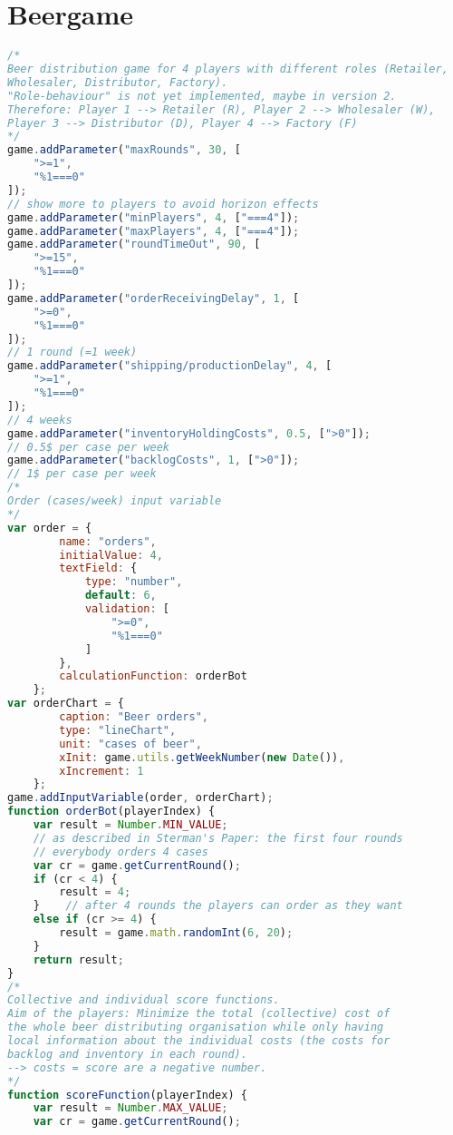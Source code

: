 \section{Beergame} \label{App:beer}
\begin{lstlisting}[language=Javascript, caption=Game code of the beergame, label=lst:beergame]
/* 
Beer distribution game for 4 players with different roles (Retailer,
Wholesaler, Distributor, Factory).
"Role-behaviour" is not yet implemented, maybe in version 2.
Therefore: Player 1 --> Retailer (R), Player 2 --> Wholesaler (W),
Player 3 --> Distributor (D), Player 4 --> Factory (F)
*/
game.addParameter("maxRounds", 30, [
    ">=1",
    "%1===0"
]);
// show more to players to avoid horizon effects
game.addParameter("minPlayers", 4, ["===4"]);
game.addParameter("maxPlayers", 4, ["===4"]);
game.addParameter("roundTimeOut", 90, [
    ">=15",
    "%1===0"
]);
game.addParameter("orderReceivingDelay", 1, [
    ">=0",
    "%1===0"
]);
// 1 round (=1 week)
game.addParameter("shipping/productionDelay", 4, [
    ">=1",
    "%1===0"
]);
// 4 weeks
game.addParameter("inventoryHoldingCosts", 0.5, [">0"]);
// 0.5$ per case per week
game.addParameter("backlogCosts", 1, [">0"]);
// 1$ per case per week
/*
Order (cases/week) input variable
*/
var order = {
        name: "orders",
        initialValue: 4,
        textField: {
            type: "number",
            default: 6,
            validation: [
                ">=0",
                "%1===0"
            ]
        },
        calculationFunction: orderBot
    };
var orderChart = {
        caption: "Beer orders",
        type: "lineChart",
        unit: "cases of beer",
        xInit: game.utils.getWeekNumber(new Date()),
        xIncrement: 1
    };
game.addInputVariable(order, orderChart);
function orderBot(playerIndex) {
    var result = Number.MIN_VALUE;
    // as described in Sterman's Paper: the first four rounds
    // everybody orders 4 cases
    var cr = game.getCurrentRound();
    if (cr < 4) {
        result = 4;
    }    // after 4 rounds the players can order as they want
    else if (cr >= 4) {
        result = game.math.randomInt(6, 20);
    }
    return result;
}
/*
Collective and individual score functions.
Aim of the players: Minimize the total (collective) cost of
the whole beer distributing organisation while only having
local information about the individual costs (the costs for
backlog and inventory in each round).
--> costs = score are a negative number.
*/
function scoreFunction(playerIndex) {
    var result = Number.MAX_VALUE;
    var cr = game.getCurrentRound();

\end{lstlisting}
